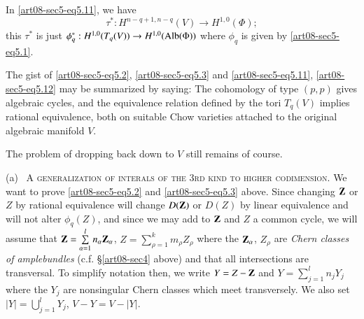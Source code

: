 \begin{remark*}
In \eqref{art08-sec5-eq5.11}, we have
\begin{equation}
\tau^{*}:H^{n-q+1,n-q}(V)\to H^{1,0}(\Phi);\label{art08-sec5-eq5.13}
\end{equation}
this $\tau^{*}$ is just $\phi^{*}_{q}:H^{1,0}(T_{q}(V))\to H^{1,0}(\operatorname{\mathrm{Alb}}(\Phi))$ where $\phi_{q}$ is given by \eqref{art08-sec5-eq5.1}.
\end{remark*}

\setcounter{theorem}{13}
\begin{remark}\label{art08-sec5-rem5.14}
The gist of \eqref{art08-sec5-eq5.2}, \eqref{art08-sec5-eq5.3} and \eqref{art08-sec5-eq5.11}, \eqref{art08-sec5-eq5.12} may be summarized by saying: The cohomology of type $(p,p)$ gives algebraic cycles, and the equivalence relation defined by the tori $T_{q}(V)$ implies rational equivalence, both on suitable Chow varieties attached to the original algebraic manifold $V$.
\end{remark}

The problem of dropping back down to $V$ still remains of course.

(a)~ \textsc{A generalization of interals of the 3rd kind to higher codimension.} We want to prove \eqref{art08-sec5-eq5.2} and \eqref{art08-sec5-eq5.3} above. Since changing $\mathbf{Z}$ or $Z$ by rational equivalence will change $D(\mathbf{Z})$ or $D(Z)$ by linear equivalence and will not alter $\phi_{q}(Z)$, and since we may add to $\mathbf{Z}$ and $Z$ a common cycle, we will assume that $\mathbf{Z}=\sum\limits^{l}_{\alpha=1}n_{\alpha}\mathbf{Z}_{\alpha}$, $Z=\sum\limits^{k}_{\rho=1}m_{\rho}Z_{\rho}$ where the $\mathbf{Z}_{\alpha}$, $Z_{\rho}$ are {\em Chern classes of ample\pageoriginale bundles} (c.f. \S\ref{art08-sec4} above) and that all intersections are transversal. To simplify notation then, we write $Y=Z-\mathbf{Z}$ and $Y=\sum\limits^{l}_{j=1}n_{j}Y_{j}$ where the $Y_{j}$ are nonsingular Chern classes which meet transversely. We also set $|Y|=\bigcup\limits^{l}_{j=1}Y_{j}$, $V-Y=V-|Y|$.


